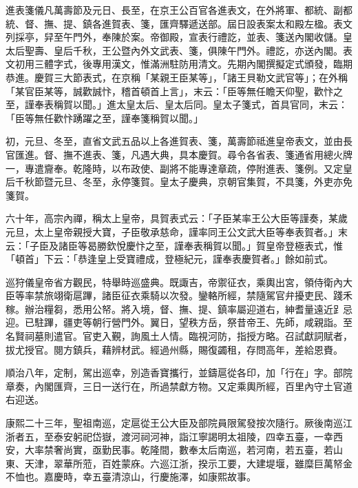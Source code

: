 \begin{pinyinscope}
進表箋儀凡萬壽節及元日、長至，在京王公百官各進表文，在外將軍、都統、副都統、督、撫、提、鎮各進賀表、箋，匯齊驛遞送部。屆日設表案太和殿左楹。表文列採亭，舁至午門外，奉陳於案。帝御殿，宣表行禮訖，並表、箋送內閣收儲。皇太后聖壽、皇后千秋，王公暨內外文武表、箋，俱陳午門外。禮訖，亦送內閣。表文初用三體字式，後專用漢文，惟滿洲駐防用清文。先期內閣撰擬定式頒發，臨期恭進。慶賀三大節表式，在京稱「某親王臣某等」，「諸王貝勒文武官等」；在外稱「某官臣某等，誠歡誠忭，稽首頓首上言」，末云：「臣等無任瞻天仰聖，歡忭之至，謹奉表稱賀以聞。」進太皇太后、皇太后同。皇太子箋式，首具官同，末云：「臣等無任歡忭踴躍之至，謹奉箋稱賀以聞。」

初，元旦、冬至，直省文武五品以上各進賀表、箋，萬壽節祗進皇帝表文，並由長官匯進。督、撫不進表、箋，凡遇大典，具本慶賀。尋令各省表、箋通省用總火牌一，專遣齎奉。乾隆時，以布政使、副將不能專達章疏，停附進表、箋例。又定皇后千秋節暨元旦、冬至，永停箋賀。皇太子慶典，京朝官集賀，不具箋，外吏亦免箋賀。

六十年，高宗內禪，稱太上皇帝，具賀表式云：「子臣某率王公大臣等謹奏，某歲元旦，太上皇帝親授大寶，子臣敬承慈命，謹率同王公文武大臣等奉表賀者。」末云：「子臣及諸臣等曷勝欽悅慶忭之至，謹奉表稱賀以聞。」賀皇帝登極表式，惟「頓首」下云：「恭逢皇上受寶禮成，登極紀元，謹奉表慶賀者。」餘如前式。

巡狩儀皇帝省方觀民，特舉時巡盛典。既諏吉，帝禦征衣，乘輿出宮，領侍衛內大臣等率禁旅翊衛扈蹕，諸臣征衣乘騎以次發。鑾輅所經，禁隨駕官弁擾吏民、踐禾稼。辦治糧芻，悉用公帑。將入境，督、撫、提、鎮率屬迎道右，紳耆量遠近𧾷忌迎。已駐蹕，疆吏等朝行營門外。翼日，望秩方岳，祭昔帝王、先師，咸親詣。至名賢祠墓則遣官。官吏入覲，詢風土人情。臨視河防，指授方略。召試獻詞賦者，拔尤授官。閱方鎮兵，藉辨材武。經過州縣，賜復蠲租，存問高年，差給恩賚。

順治八年，定制，駕出巡幸，別造香寶攜行，並鑄扈從各印，加「行在」字。部院章奏，內閣匯齊，三日一送行在，所過禁獻方物。又定乘輿所經，百里內守土官道右迎送。

康熙二十三年，聖祖南巡，定扈從王公大臣及部院員限駕發按次隨行。厥後南巡江浙者五，至泰安躬祀岱嶽，渡河祠河神，詣江寧謁明太祖陵，四幸五臺，一幸西安，大率禁奢尚實，亟勤民事。乾隆間，數奉太后南巡，若河南，若五臺，若山東、天津，翠華所蒞，百姓蒙庥。六巡江浙，揆示工要，大建堤堰，雖糜巨萬帑金不恤也。嘉慶時，幸五臺清涼山，行慶施澤，如康熙故事。


\end{pinyinscope}
